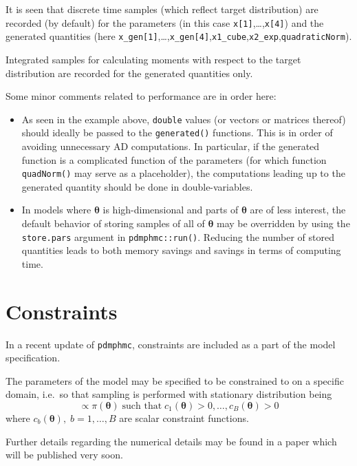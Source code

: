 \documentclass[
]{book}
\begin{document}
It is seen that discrete time samples (which reflect target distribution) are recorded (by default) for the parameters (in this case \texttt{x{[}1{]}},\ldots,\texttt{x{[}4{]}}) and the generated quantities (here \texttt{x\_gen{[}1{]}},\ldots,\texttt{x\_gen{[}4{]}},\texttt{x1\_cube},\texttt{x2\_exp},\texttt{quadraticNorm}).

Integrated samples for calculating moments with respect to the target distribution are recorded for the generated quantities only.

Some minor comments related to performance are in order here:

\begin{itemize}
\item
  As seen in the example above, \texttt{double} values (or vectors or matrices thereof) should ideally be passed to the \texttt{generated()} functions. This is in order of avoiding unnecessary AD computations. In particular, if the generated function is a complicated function of the parameters (for which function \texttt{quadNorm()} may serve as a placeholder), the computations leading up to the generated quantity should be done in double-variables.
\item
  In models where \(\boldsymbol \theta\) is high-dimensional and parts of \(\boldsymbol \theta\) are of less interest, the default behavior of storing samples of all of \(\boldsymbol \theta\) may be overridden by using the \texttt{store.pars} argument in \texttt{pdmphmc::run()}. Reducing the number of stored quantities leads to both memory savings and savings in terms of computing time.
\end{itemize}

\hypertarget{constraints}{%
\chapter{Constraints}\label{constraints}}

In a recent update of \texttt{pdmphmc}, constraints are included as a part of the model specification.

The parameters of the model may be specified to be constrained to on a specific domain, i.e.~so that sampling is performed with stationary distribution being
\[
\propto \pi(\boldsymbol \theta) \; \text{such that}\; c_1(\boldsymbol \theta)>0,\dots,c_B(\boldsymbol \theta)>0
\]
where \(c_b(\boldsymbol \theta),\;b=1,\dots,B\) are scalar constraint functions.

Further details regarding the numerical details may be found in a paper which will be published very soon.
\end{document}
